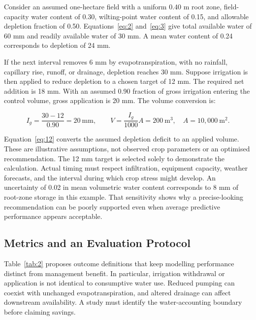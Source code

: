 \documentclass[acmsmall,screen,nonacm]{acmart}
\begin{document}
\label{sec:8-2}

Consider an assumed one-hectare field with a uniform 0.40 m root zone, field-capacity water content of 0.30, wilting-point water content of 0.15, and allowable depletion fraction of 0.50. Equations~\eqref{eq:2} and~\eqref{eq:3} give total available water of 60 mm and readily available water of 30 mm. A mean water content of 0.24 corresponds to depletion of 24 mm.

If the next interval removes 6 mm by evapotranspiration, with no rainfall, capillary rise, runoff, or drainage, depletion reaches 30 mm. Suppose irrigation is then applied to reduce depletion to a chosen target of 12 mm. The required net addition is 18 mm. With an assumed 0.90 fraction of gross irrigation entering the control volume, gross application is 20 mm. The volume conversion is:

\begin{equation}
I_g=\frac{30-12}{0.90}=20\ \mathrm{mm},\qquad V=\frac{I_g}{1000}A=200\ \mathrm{m^3},\quad A=10{,}000\ \mathrm{m^2}.
\label{eq:12}
\end{equation}

Equation~\eqref{eq:12} converts the assumed depletion deficit to an applied volume. These are illustrative assumptions, not observed crop parameters or an optimised recommendation. The 12 mm target is selected solely to demonstrate the calculation. Actual timing must respect infiltration, equipment capacity, weather forecasts, and the interval during which crop stress might develop. An uncertainty of 0.02 in mean volumetric water content corresponds to 8 mm of root-zone storage in this example. That sensitivity shows why a precise-looking recommendation can be poorly supported even when average predictive performance appears acceptable.

\subsection{Metrics and an Evaluation Protocol}

\label{sec:8-3}

Table~\ref{tab:2} proposes outcome definitions that keep modelling performance distinct from management benefit. In particular, irrigation withdrawal or application is not identical to consumptive water use. Reduced pumping can coexist with unchanged evapotranspiration, and altered drainage can affect downstream availability. A study must identify the water-accounting boundary before claiming savings.
\end{document}
